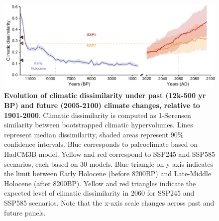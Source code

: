 \documentclass[pdflatex, sn-nature]{sn-jnl}%
\begin{document}
\begin{figure}[ht]
\centering
\hspace*{-0.6in}
\includegraphics[scale=1]{climatic_dissimilarity.pdf}
\caption{\textbf{Evolution of climatic dissimilarity under past (12k-500 yr BP) and future (2005-2100) climate changes, relative to 1901-2000}. Climatic dissimilarity is computed as 1-Sørensen similarity between bootstrapped climatic hypervolumes. Lines represent median dissimilarity, shaded areas represent 90\% confidence intervals. Blue corresponds to paleoclimate based on HadCM3B model. Yellow and red correspond to SSP245 and SSP585 scenarios, each based on 30 models. Blue triangle on y-axis indicates the limit between Early Holocene (before 8200BP) and Late-Middle Holocene (after 8200BP). Yellow and red triangles indicate the expected level of climatic dissimilarity in 2060 for SSP245 and SSP585 scenarios. Note that the x-axis scale changes across past and future panels.}\label{climatic_dissimilarity}
\end{figure}
\end{document}
